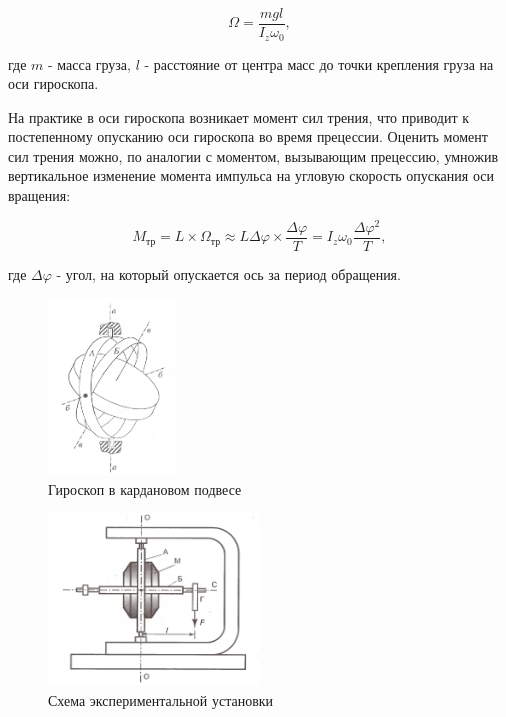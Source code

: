 \documentclass[a4paper,12pt]{article} %
\begin{document}
\begin{equation}
    \Omega = \frac{mgl}{I_z\omega_0},
    \label{turnRate}
\end{equation}

где $ m $ - масса груза, $ l $ - расстояние от центра масс до точки крепления груза на оси гироскопа.

На практике в оси гироскопа возникает момент сил трения, что приводит к постепенному опусканию оси гироскопа во время прецессии. Оценить момент сил трения можно, по аналогии с моментом, вызывающим прецессию, умножив вертикальное изменение момента импульса на угловую скорость опускания оси вращения:

\begin{equation}
    M_\text{тр} = L \times \Omega_\text{тр} \approx L\Delta\varphi \times \frac{\Delta\varphi}{T} = I_z \omega_0 \frac{\Delta\varphi^2}{T},
    \label{frictionMoment}
\end{equation}

где $ \Delta\varphi $ - угол, на который опускается ось за период обращения.

\begin{figure}[h]
    \centering
    \includegraphics[width = 0.3\textwidth]{1.2.5 gyro.PNG}
    \caption{Гироскоп в кардановом подвесе}
    \label{fig:gyro}
\end{figure}

\begin{figure}[h]
    \centering
    \includegraphics[width = 0.5\textwidth]{1.2.5 setup.PNG}
    \caption{Схема экспериментальной установки}
    \label{fig:setup}
\end{figure}
\end{document}
